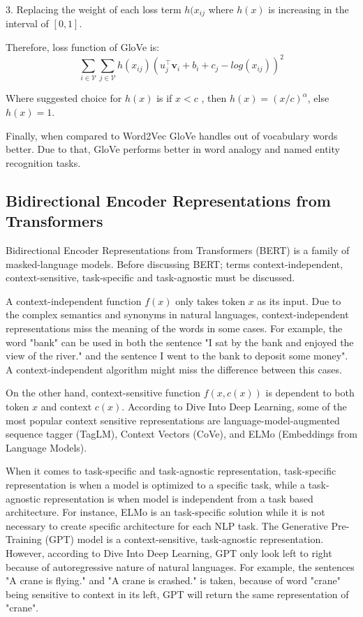 \documentclass[man]{apa7}
\begin{document}
3. Replacing the weight of each loss term $h(x_{ij}$ where $h(x)$ is increasing in the interval of $[0,1]$.
 
Therefore, loss function of GloVe is:
\begin{equation}
\sum_{i \in \mathcal{V}} \sum_{j \in \mathcal{V}} h(x_{ij})(u_j^\top \mathbf{v}_i + b_i +c_j -log(x_{ij}))^2
\end{equation}


Where suggested choice for $h(x)$ is if $x < c$ , then $h(x) = (x/c)^\alpha$, else $h(x) = 1$. 

Finally, when compared to Word2Vec GloVe handles out of vocabulary words better. Due to that, GloVe performs better in word analogy and named entity recognition tasks. 

\subsection{Bidirectional Encoder Representations from Transformers}
Bidirectional Encoder Representations from Transformers (BERT) is a family of masked-language models. Before discussing BERT; terms context-independent, context-sensitive, task-specific and task-agnostic must be discussed.

A context-independent function $f(x)$ only takes token $x$ as its input. Due to the complex semantics and synonyms in natural languages, context-independent representations miss the meaning of the words in some cases. For example, the word "bank" can be used in both the sentence "I sat by the bank and enjoyed the view of the river." and the sentence I went to the bank to deposit some money". A context-independent algorithm might miss the difference between this cases.

On the other hand, context-sensitive function $f(x,c(x))$ is dependent to both token $x$ and context $c(x)$. According to Dive Into Deep Learning, some of the most popular context sensitive representations are language-model-augmented sequence tagger (TagLM), Context Vectors (CoVe), and ELMo (Embeddings from Language Models).

When it comes to task-specific and task-agnostic representation, task-specific representation is when a model is optimized to a specific task, while a task-agnostic representation is when model is independent from a task based architecture. For instance, ELMo is an task-specific solution while it is not necessary to create specific architecture for each NLP task. The Generative Pre-Training  (GPT) model is a context-sensitive, task-agnostic representation. However, according to Dive Into Deep Learning, GPT only look left to right because of autoregressive nature of natural languages. For example, the sentences "A crane is flying." and "A crane is crashed." is taken, because of word "crane" being sensitive to context in its left, GPT will return the same representation of "crane".
\end{document}
